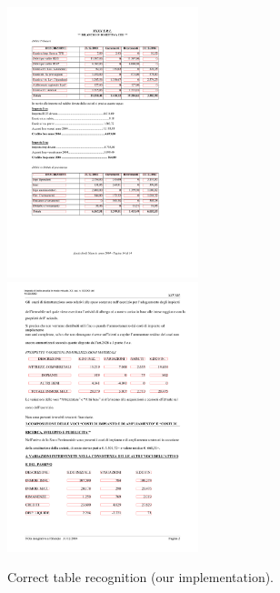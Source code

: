 \begin{figure}[t]
\centering
\includegraphics[width=15em]{img/results/goodRes1.png}
\includegraphics[width=15em]{img/results/goodRes2.png}
\caption{Correct table recognition (our implementation).}
\label{fig:sampleResults}
\end{figure}


